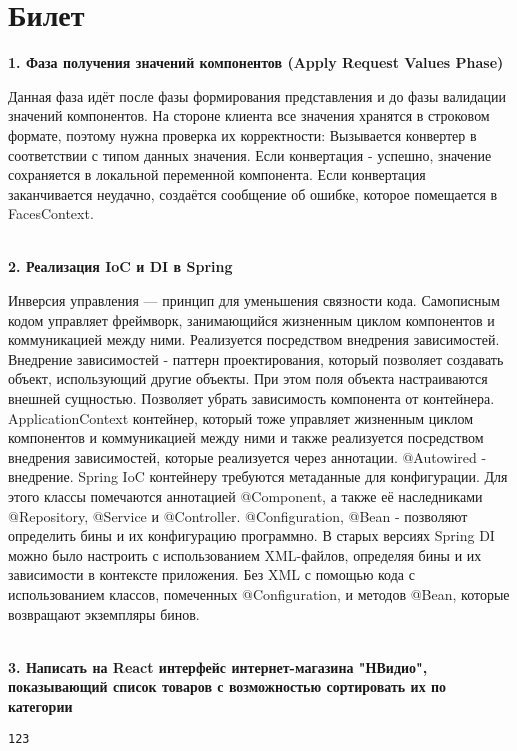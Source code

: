 \documentclass{article}
\newcommand{\bil}[5]{%
        \section{Билет}
        \textbf{1. #1}

        #4
        \\
        \textbf{2. #2}
        
        #5
        \\
        \textbf{3. #3}
}
\begin{document}
\bil{Фаза получения значений компонентов (Apply Request Values Phase)}
{Реализация IoC и DI в Spring}
{Написать на React интерфейс интернет-магазина "НВидио", показывающий список товаров с возможностью сортировать их по категории}{
    Данная фаза идёт после фазы формирования представления и до фазы валидации значений компонентов. 
    На стороне клиента все значения хранятся в строковом формате, поэтому нужна проверка их корректности: Вызывается конвертер в соответствии с типом данных значения. 
    Если конвертация - успешно, значение сохраняется в локальной переменной компонента. 
    Если конвертация заканчивается неудачно, создаётся сообщение об ошибке, которое помещается в FacesContext.
}{
    Инверсия управления — принцип для уменьшения связности кода. 
    Самописным кодом управляет фреймворк, занимающийся жизненным циклом компонентов и коммуникацией между ними. 
    Реализуется посредством внедрения зависимостей. Внедрение зависимостей - паттерн проектирования, который позволяет создавать объект, использующий другие объекты. 
    При этом поля объекта настраиваются внешней сущностью. 
    Позволяет убрать зависимость компонента от контейнера. 
    ApplicationContext контейнер, который тоже управляет жизненным циклом компонентов и коммуникацией между ними и также реализуется посредством внедрения зависимостей, которые реализуется через аннотации. 
    @Autowired - внедрение. Spring IoC контейнеру требуются метаданные для конфигурации. Для этого классы помечаются аннотацией @Component, а также её наследниками @Repository, @Service и @Controller. @Configuration, @Bean - позволяют определить бины и их конфигурацию программно. 
    В старых версиях Spring DI можно было настроить с использованием XML-файлов, определяя бины и их зависимости в контексте приложения. Без XML с помощью кода с использованием классов, помеченных @Configuration, и методов @Bean, которые возвращают экземпляры бинов.
}
\begin{lstlisting}[frame=single, basicstyle=\ttfamily, breaklines=true, breakatwhitespace=true, postbreak=\mbox{\textcolor{red}{$\hookrightarrow$}\space}]
123
\end{lstlisting}
\end{document}
